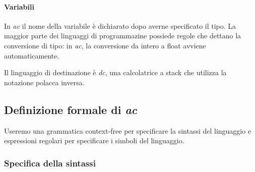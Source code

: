 \documentclass[11pt]{article}
\begin{document}
\paragraph*{Variabili} In \textit{ac} il nome della variabile è dichiarato dopo averne specificato il tipo.
La maggior parte dei linguaggi di programmazine possiede regole che dettano la conversione di tipo: in \textit{ac}, la 
conversione da intero a float avviene automaticamente.

Il linguaggio di destinazione è \textit{dc}, una calcolatrice a stack che utilizza la notazione polacca inversa.
\subsection{Definizione formale di \textit{ac}}
Useremo una grammatica context-free per specificare la sintassi del linguaggio e espressioni regolari per specificare i 
simboli del linguaggio.
\subsubsection{Specifica della sintassi}
\end{document}
